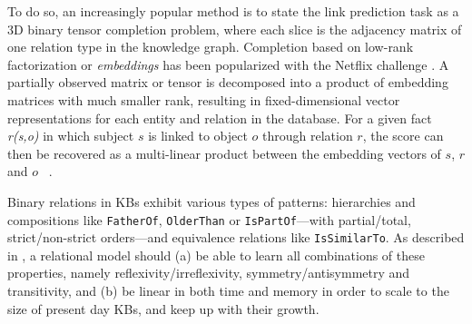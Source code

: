 \documentclass{article}
\def\tt{\texttt}
\newcommand{\Johans}[1]{\todo[inline,backgroundcolor=green!20!green]{Johans: #1}}
\newcommand{\Seb}[1]{\todo[inline,backgroundcolor=white!20!white]{Seb: #1}}
\begin{document}
To do so, an increasingly popular method is to state the link prediction task as a 3D binary tensor completion problem, where each slice is the adjacency matrix of one relation type in the knowledge graph.
Completion based on low-rank factorization or \emph{embeddings} has been popularized with the Netflix challenge \cite{koren_netflix}. A partially observed matrix or tensor is decomposed into a product of embedding matrices with much smaller rank, resulting in fixed-dimensional vector representations %
for each entity and relation in the database. 
For a given fact \emph{r(s,o)} in which subject $s$ is linked to object $o$ through relation $r$, the score can then be recovered as a multi-linear product between the embedding vectors of $s$, $r$ and $o$ ~\cite{nickel_2016_review}.


Binary relations in KBs exhibit various types of patterns: hierarchies and compositions like \tt{FatherOf}, \tt{OlderThan} or \tt{IsPartOf}---with partial/total, strict/non-strict orders---and  equivalence relations like \tt{IsSimilarTo}. As described in \citet{Bordes2013}, a relational model should (a) be able to learn all \mbox{combinations} of these properties, namely reflexivity/irreflexivity, symmetry/antisymmetry and transitivity, and (b) be linear in both time and memory in order to scale to the size of present day KBs, and keep up with their growth. 
\end{document}
